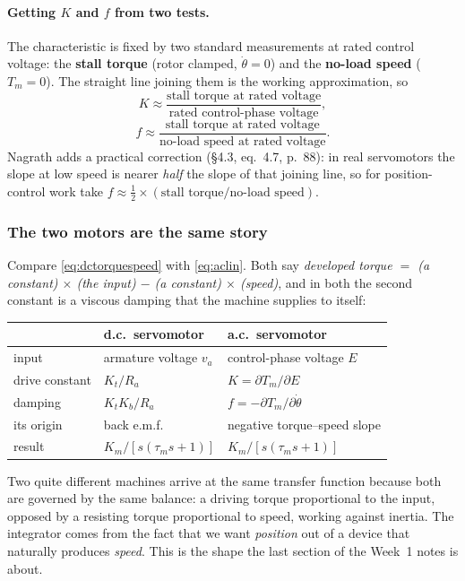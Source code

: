 \documentclass[11pt,a4paper]{article}
\begin{document}
\paragraph{Getting $K$ and $f$ from two tests.} The characteristic is fixed by
two standard measurements at rated control voltage: the \textbf{stall torque}
(rotor clamped, $\dot\theta=0$) and the \textbf{no-load speed} ($T_{m}=0$). The
straight line joining them is the working approximation, so
\[
  K\approx\frac{\text{stall torque at rated voltage}}
               {\text{rated control-phase voltage}},
\]
\[
  f\approx\frac{\text{stall torque at rated voltage}}
               {\text{no-load speed at rated voltage}} .
\]
Nagrath adds a practical correction (\S4.3, eq.~4.7, p.~88): in real
servomotors the slope at low speed is nearer \emph{half} the slope of that
joining line, so for position-control work take
$f\approx\tfrac{1}{2}\times(\text{stall torque}/\text{no-load speed})$.

\subsubsection{The two motors are the same story}
\label{sss:samething}

\begin{keyidea}
Compare \eqref{eq:dctorquespeed} with \eqref{eq:aclin}. Both say
\emph{developed torque $=$ (a constant) $\times$ (the input) $-$ (a constant)
$\times$ (speed)}, and in both the second constant is a viscous damping that
the machine supplies to itself:
\begin{center}
\begin{tabular}{lll}
\toprule
 & d.c.\ servomotor & a.c.\ servomotor \\
\midrule
input          & armature voltage $v_{a}$ & control-phase voltage $E$ \\
drive constant & $K_{t}/R_{a}$            & $K=\partial T_{m}/\partial E$ \\
damping        & $K_{t}K_{b}/R_{a}$       & $f=-\partial T_{m}/\partial\dot\theta$ \\
its origin     & back e.m.f.              & negative torque--speed slope \\
result         & $K_{m}/[s(\tau_{m}s+1)]$ & $K_{m}/[s(\tau_{m}s+1)]$ \\
\bottomrule
\end{tabular}
\end{center}
Two quite different machines arrive at the same transfer function because both
are governed by the same balance: a driving torque proportional to the input,
opposed by a resisting torque proportional to speed, working against inertia.
The integrator comes from the fact that we want \emph{position} out of a device
that naturally produces \emph{speed}. This is the shape the last section of the
Week~1 notes is about.
\end{keyidea}
\end{document}
